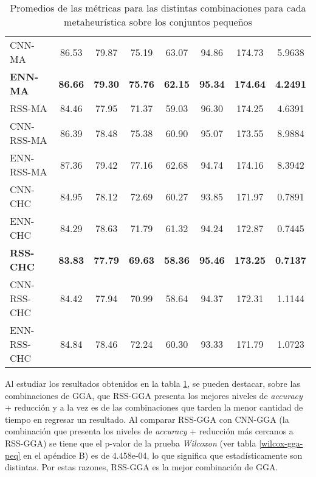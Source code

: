 \begin{table}[h!]
\begin{adjustbox}{max width =\textwidth}
\begin{tabular}{l c c c c c c c}
\hline

CNN-MA & 86.53 & 79.87 & 75.19 & 63.07 & 94.86 & 174.73 & 5.9638 \\
\textbf{ENN-MA} & \textbf{86.66} & \textbf{79.30} & \textbf{75.76} & \textbf{62.15} & \textbf{95.34} & \textbf{174.64} & \textbf{4.2491} \\
RSS-MA & 84.46 & 77.95 & 71.37 & 59.03 & 96.30 & 174.25 & 4.6391 \\
CNN-RSS-MA  & 86.39 & 78.48 & 75.38 & 60.90 & 95.07 & 173.55 & 8.9884 \\
ENN-RSS-MA & 87.36 & 79.42 & 77.16 & 62.68 & 94.74 & 174.16 & 8.3942 \\

\hline

CNN-CHC & 84.95 & 78.12 & 72.69 & 60.27 & 93.85 & 171.97 & 0.7891 \\
ENN-CHC & 84.29 & 78.63 & 71.79 & 61.32 & 94.24 & 172.87 & 0.7445 \\
\textbf{RSS-CHC} & \textbf{83.83} & \textbf{77.79} & \textbf{69.63} & \textbf{58.36} & \textbf{95.46} & \textbf{173.25} & \textbf{0.7137} \\
CNN-RSS-CHC  & 84.42 & 77.94 & 70.99 & 58.64 & 94.37 & 172.31 & 1.1144 \\
ENN-RSS-CHC & 84.84 & 78.46 & 72.24 & 60.30 & 93.33 & 171.79 & 1.0723 \\

\hline
\end{tabular}
\end{adjustbox}
\caption{Promedios de las métricas para las distintas combinaciones para cada metaheurística sobre los conjuntos pequeños}
\label{peq-all}

\end{table}

Al estudiar los resultados obtenidos en la tabla \ref{peq-all}, se pueden destacar, sobre las combinaciones de GGA, que RSS-GGA presenta los mejores niveles de \emph{accuracy} + reducción y a la vez es de las combinaciones que tarden la menor cantidad de tiempo en regresar un resultado. Al comparar RSS-GGA con CNN-GGA (la combinación que presenta los niveles de \emph{accuracy} + reducción más cercanos a RSS-GGA) se tiene que el p-valor de la prueba \emph{Wilcoxon} (ver tabla \ref{wilcox-gga-peq} en el apéndice B) es de 4.458e-04, lo que significa que estadísticamente son distintas. Por estas razones, RSS-GGA es la mejor combinación de GGA.


